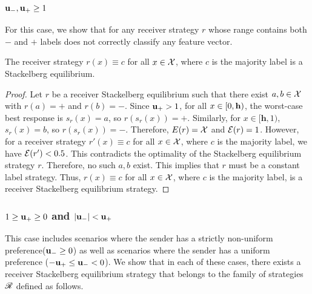 \subsubsection{$\mathbf{u_-},\mathbf{u_+} \geq 1$}
For this case, we show that for any receiver strategy $r$ whose range contains both $\minus$ and $\plus$ labels does not correctly classify any feature vector.

\begin{thm}
The receiver strategy $r(x) \equiv c$ for all $x \in \mathcal{X}$, where $c$ is the majority label is a Stackelberg equilibrium.
	
\end{thm}

\begin{proof}
Let $r$ be a receiver Stackelberg equilibrium such that there exist $a, b \in \mathcal{X}$ with $r(a) = \plus$ and $r(b) = \minus$. Since $\mathbf{u_+} > 1$, for all $x \in [0, \mathbf{h})$, the worst-case best response is $s_r(x) = a$, so $r(s_r(x)) = \plus$. Similarly, for $x \in [\mathbf{h}, 1)$, $s_r(x) = b$, so $r(s_r(x)) = \minus$. Therefore, $E(r) = \mathcal{X}$ and $\mathcal{E}(r) = 1$.
However, for a receiver strategy $r'(x) \equiv c$ for all $x \in \mathcal{X}$, where $c$ is the majority label, we have $\mathcal{E}(r') < 0.5$. This contradicts the optimality of the Stackelberg equilibrium strategy $r$. Therefore, no such $a, b$ exist. This implies that $r$ must be a constant label strategy. Thus, $r(x) \equiv c$ for all $x \in \mathcal{X}$, where $c$ is the majority label, is a receiver Stackelberg equilibrium strategy.
\end{proof}


\subsubsection{$1 \geq \mathbf{u_+} \geq 0$ and  \textbf{$|\mathbf{u_-}| < \mathbf{u_+}$}}
This case includes scenarios where the sender has a strictly non-uniform preference($\mathbf{u_-} \geq 0$) as well as scenarios where the sender has a uniform preference ($-\mathbf{u_+} \leq \mathbf{u_-} < 0$).
We show that in each of these cases, there exists a receiver Stackelberg equilibrium strategy that belongs to the family of strategies $\mathscr{R}$ defined as follows.

